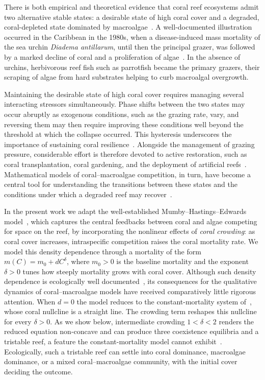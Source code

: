 \documentclass[reqno,11pt]{amsart}
\numberwithin{equation}{section}
\begin{document}
There is both empirical and theoretical evidence that coral reef ecosystems admit two alternative stable states: a desirable state of high coral cover and a degraded, coral-depleted state dominated by macroalgae~\cite{Bell04,Hugh94,Know92,Mum07}. A well-documented illustration occurred in the Caribbean in the 1980s, when a disease-induced mass mortality of the sea urchin {\it Diadema antillarum}, until then the principal grazer, was followed by a marked decline of coral and a proliferation of algae~\cite{Lessios84}. In the absence of urchins, herbivorous reef fish such as parrotfish became the primary grazers, their scraping of algae from hard substrates helping to curb macroalgal overgrowth.

Maintaining the desirable state of high coral cover requires managing several interacting stressors simultaneously. Phase shifts between the two states may occur abruptly as exogenous conditions, such as the grazing rate, vary, and reversing them may then require improving these conditions well beyond the threshold at which the collapse occurred. This hysteresis underscores the importance of sustaining coral resilience~\cite{Black12,Fun11}. Alongside the management of grazing pressure, considerable effort is therefore devoted to active restoration, such as coral transplantation, coral gardening, and the deployment of artificial reefs~\cite{Bayraktarov19}. Mathematical models of coral--macroalgae competition, in turn, have become a central tool for understanding the transitions between these states and the conditions under which a degraded reef may recover~\cite{Black12,Mum07,ZhYu22}.

In the present work we adapt the well-established Mumby--Hastings--Edwards model~\cite{Mum07}, which captures the central feedbacks between coral and algae competing for space on the reef, by incorporating the nonlinear effects of {\it coral crowding}: as coral cover increases, intraspecific competition raises the coral mortality rate. We model this density dependence through a mortality of the form $m(C)=m_0+dC^{\delta}$, where $m_0>0$ is the baseline mortality and the exponent $\delta>0$ tunes how steeply mortality grows with coral cover. Although such density dependence is ecologically well documented~\cite{Hughes84}, its consequences for the qualitative dynamics of coral--macroalgae models have received comparatively little rigorous attention. When $d=0$ the model reduces to the constant-mortality system of~\cite{Mum07,Li14}, whose coral nullcline is a straight line. The crowding term reshapes this nullcline for every $\delta>0$. As we show below, intermediate crowding $1<\delta<2$ renders the reduced equation non-concave and can produce three coexistence equilibria and a tristable reef, a feature the constant-mortality model cannot exhibit~\cite{Black12,Li14,Mum07,ZhYu22}. Ecologically, such a tristable reef can settle into coral dominance, macroalgae dominance, or a mixed coral--macroalgae community, with the initial cover deciding the outcome.
\end{document}
